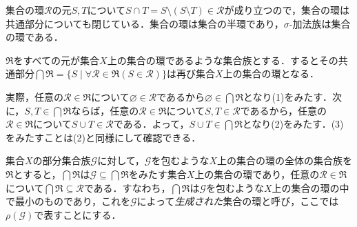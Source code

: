 \documentclass[12pt,a4paper]{jsarticle}
\begin{document}
集合の環$\mathcal{R}$の元$S, T$について$S \cap T = S \setminus (S \setminus T) \in \mathcal{R}$が成り立つので，集合の環は共通部分についても閉じている．集合の環は集合の半環であり，$\sigma$-加法族は集合の環である．

$\mathfrak{R}$をすべての元が集合$X$上の集合の環であるような集合族とする．するとその共通部分$\bigcap \mathfrak{R} = \{S \mid \forall \mathcal{R} \in \mathfrak{R}(S \in \mathcal{R})\}$は再び集合$X$上の集合の環となる．

実際，任意の$\mathcal{R} \in \mathfrak{R}$について$\varnothing \in \mathcal{R}$であるから$\varnothing \in \bigcap \mathfrak{R}$となり(1)をみたす．次に，$S, T \in \bigcap \mathfrak{R}$ならば，任意の$\mathcal{R} \in \mathfrak{R}$について$S, T \in \mathcal{R}$であるから，任意の$\mathcal{R} \in \mathfrak{R}$について$S \cup T \in \mathcal{R}$である．よって，$S \cup T \in \bigcap \mathfrak{R}$となり(2)をみたす．(3)をみたすことは(2)と同様にして確認できる．

集合$X$の部分集合族$\mathcal{G}$に対して，$\mathcal{G}$を包むような$X$上の集合の環の全体の集合族を$\mathfrak{R}$とすると，$\bigcap \mathfrak{R}$は$\mathcal{G} \subseteq \bigcap \mathfrak{R}$をみたす集合$X$上の集合の環であり，任意の$\mathcal{R} \in \mathfrak{R}$について$\bigcap \mathfrak{R} \subseteq \mathcal{R}$である．すなわち，$\bigcap \mathfrak{R}$は$\mathcal{G}$を包むような$X$上の集合の環の中で最小のものであり，これを$\mathcal{G}$によって\emph{生成された}集合の環と呼び，ここでは$\rho(\mathcal{G})$で表すことにする．
\end{document}
